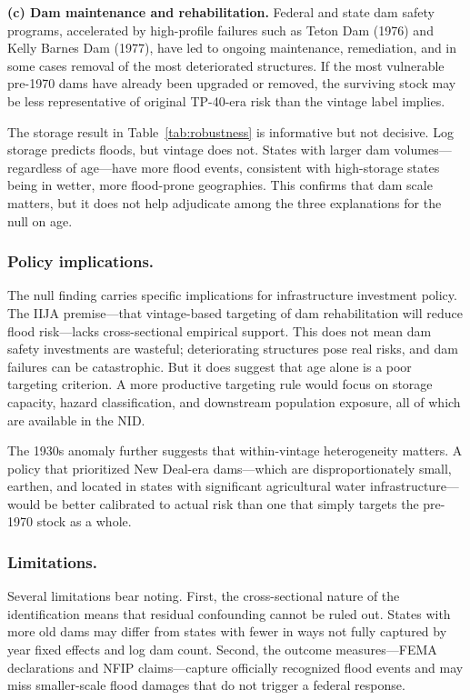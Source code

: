\documentclass[12pt]{article}
\begin{document}
\textbf{(c) Dam maintenance and rehabilitation.} Federal and state dam safety programs, accelerated by high-profile failures such as Teton Dam (1976) and Kelly Barnes Dam (1977), have led to ongoing maintenance, remediation, and in some cases removal of the most deteriorated structures. If the most vulnerable pre-1970 dams have already been upgraded or removed, the surviving stock may be less representative of original TP-40-era risk than the vintage label implies.

The storage result in Table~\ref{tab:robustness} is informative but not decisive. Log storage predicts floods, but vintage does not. States with larger dam volumes---regardless of age---have more flood events, consistent with high-storage states being in wetter, more flood-prone geographies. This confirms that dam scale matters, but it does not help adjudicate among the three explanations for the null on age.

\subsubsection*{Policy implications.}

The null finding carries specific implications for infrastructure investment policy. The IIJA premise---that vintage-based targeting of dam rehabilitation will reduce flood risk---lacks cross-sectional empirical support. This does not mean dam safety investments are wasteful; deteriorating structures pose real risks, and dam failures can be catastrophic. But it does suggest that age alone is a poor targeting criterion. A more productive targeting rule would focus on storage capacity, hazard classification, and downstream population exposure, all of which are available in the NID.

The 1930s anomaly further suggests that within-vintage heterogeneity matters. A policy that prioritized New Deal-era dams---which are disproportionately small, earthen, and located in states with significant agricultural water infrastructure---would be better calibrated to actual risk than one that simply targets the pre-1970 stock as a whole.

\subsubsection*{Limitations.}

Several limitations bear noting. First, the cross-sectional nature of the identification means that residual confounding cannot be ruled out. States with more old dams may differ from states with fewer in ways not fully captured by year fixed effects and log dam count. Second, the outcome measures---FEMA declarations and NFIP claims---capture officially recognized flood events and may miss smaller-scale flood damages that do not trigger a federal response.
\end{document}

